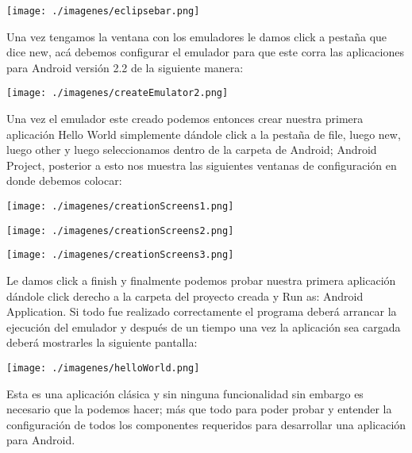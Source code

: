 \documentclass[letterpaper,12pt]{book}
\begin{document}
\begin{mainmatter}
\texttt{[image: ./imagenes/eclipsebar.png]}

Una vez tengamos la ventana con los emuladores le damos click a pestaña que 
dice new, acá debemos configurar el emulador para que este corra las aplicaciones 
para Android versión 2.2 de la siguiente manera:

\begin{center}
\texttt{[image: ./imagenes/createEmulator2.png]}
\end{center}

Una vez el emulador este creado podemos entonces crear nuestra primera aplicación 
Hello World simplemente dándole click a la pestaña de file, luego new, luego other 
y luego seleccionamos dentro de la carpeta de Android; Android Project, posterior 
a esto nos muestra las siguientes ventanas de configuración en donde debemos colocar:


\begin{center}
\texttt{[image: ./imagenes/creationScreens1.png]}
\end{center}

\begin{center}
\texttt{[image: ./imagenes/creationScreens2.png]}
\end{center}

\begin{center}
\texttt{[image: ./imagenes/creationScreens3.png]}
\end{center}


Le damos click a finish y finalmente podemos probar nuestra primera aplicación dándole 
click derecho a la carpeta del proyecto creada y Run as: Android Application. Si todo 
fue realizado correctamente el programa deberá arrancar la ejecución del emulador y 
después de un tiempo una vez la aplicación sea cargada deberá mostrarles la siguiente pantalla:

\begin{center}
\texttt{[image: ./imagenes/helloWorld.png]}
\end{center}


Esta es una aplicación clásica y sin ninguna funcionalidad sin embargo es necesario que la 
podemos hacer; más que todo para poder probar y entender la configuración de todos los 
componentes requeridos para desarrollar una aplicación para Android.


\end{mainmatter}
\end{document}
